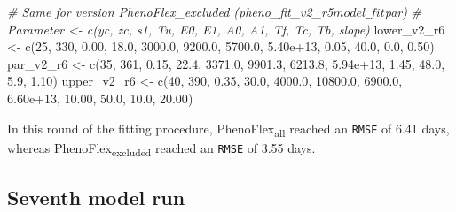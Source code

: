 \documentclass[
]{article}
\newenvironment{Shaded}{\begin{snugshade}}{\end{snugshade}}
\newcommand{\CommentTok}[1]{\textcolor[rgb]{0.56,0.35,0.01}{\textit{#1}}}
\newcommand{\DecValTok}[1]{\textcolor[rgb]{0.00,0.00,0.81}{#1}}
\newcommand{\FloatTok}[1]{\textcolor[rgb]{0.00,0.00,0.81}{#1}}
\newcommand{\FunctionTok}[1]{\textcolor[rgb]{0.00,0.00,0.00}{#1}}
\newcommand{\NormalTok}[1]{#1}
\newcommand{\OtherTok}[1]{\textcolor[rgb]{0.56,0.35,0.01}{#1}}
\begin{document}
\begin{Shaded}
\begin{Highlighting}[]
\CommentTok{\# Same for version PhenoFlex\_excluded (pheno\_fit\_v2\_r5$model\_fit$par)}
\CommentTok{\# Parameter \textless{}{-} c(yc,  zc,   s1,   Tu,     E0,      E1,     A0,       A1,   Tf,   Tc,   Tb, slope)}
\NormalTok{lower\_v2\_r6 }\OtherTok{\textless{}{-}} \FunctionTok{c}\NormalTok{(}\DecValTok{25}\NormalTok{, }\DecValTok{330}\NormalTok{, }\FloatTok{0.00}\NormalTok{, }\FloatTok{18.0}\NormalTok{, }\FloatTok{3000.0}\NormalTok{,  }\FloatTok{9200.0}\NormalTok{, }\FloatTok{5700.0}\NormalTok{, }\FloatTok{5.40e+13}\NormalTok{,  }\FloatTok{0.05}\NormalTok{, }\FloatTok{40.0}\NormalTok{,  }\FloatTok{0.0}\NormalTok{,  }\FloatTok{0.50}\NormalTok{)}
\NormalTok{par\_v2\_r6   }\OtherTok{\textless{}{-}} \FunctionTok{c}\NormalTok{(}\DecValTok{35}\NormalTok{, }\DecValTok{361}\NormalTok{, }\FloatTok{0.15}\NormalTok{, }\FloatTok{22.4}\NormalTok{, }\FloatTok{3371.0}\NormalTok{,  }\FloatTok{9901.3}\NormalTok{, }\FloatTok{6213.8}\NormalTok{, }\FloatTok{5.94e+13}\NormalTok{,  }\FloatTok{1.45}\NormalTok{, }\FloatTok{48.0}\NormalTok{,  }\FloatTok{5.9}\NormalTok{,  }\FloatTok{1.10}\NormalTok{)}
\NormalTok{upper\_v2\_r6 }\OtherTok{\textless{}{-}} \FunctionTok{c}\NormalTok{(}\DecValTok{40}\NormalTok{, }\DecValTok{390}\NormalTok{, }\FloatTok{0.35}\NormalTok{, }\FloatTok{30.0}\NormalTok{, }\FloatTok{4000.0}\NormalTok{, }\FloatTok{10800.0}\NormalTok{, }\FloatTok{6900.0}\NormalTok{, }\FloatTok{6.60e+13}\NormalTok{, }\FloatTok{10.00}\NormalTok{, }\FloatTok{50.0}\NormalTok{, }\FloatTok{10.0}\NormalTok{, }\FloatTok{20.00}\NormalTok{)}
\end{Highlighting}
\end{Shaded}

In this round of the fitting procedure, PhenoFlex\textsubscript{all}
reached an \texttt{RMSE} of 6.41 days, whereas
PhenoFlex\textsubscript{excluded} reached an \texttt{RMSE} of 3.55 days.

\hypertarget{seventh-model-run}{%
\subsection{Seventh model run}\label{seventh-model-run}}
\end{document}
